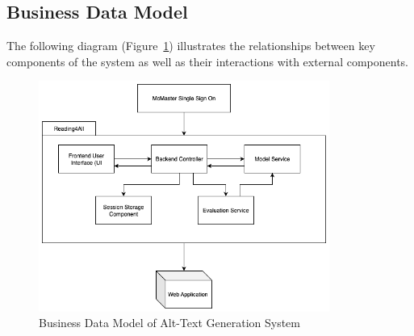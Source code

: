 \documentclass[12pt]{article}
\begin{document}
\subsection{Business Data Model}
The following diagram (Figure~\ref{fig:business_data_model}) illustrates the relationships between key components of the system as well as their interactions with external components.

\begin{figure}[h!]
    \centering
    \includegraphics[width=0.85\textwidth]{images/business-data-model.png}
    \caption{Business Data Model of Alt-Text Generation System}
    \label{fig:business_data_model}
\end{figure}
\end{document}
